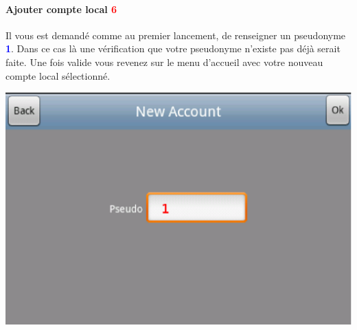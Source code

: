 \paragraph{Ajouter compte local \textcolor{red}{6}\\}
	Il vous est demandé comme au premier lancement, de renseigner un pseudonyme 
	\textcolor{blue}{\textbf{1}}. Dans ce cas là une vérification que votre
	pseudonyme n'existe pas déjà serait faite. Une fois valide vous revenez sur le menu d'accueil avec votre
	nouveau compte local sélectionné.
	\begin{center}
		\includegraphics[scale=0.6]{Manuel/Img/9.eps}
	\end{center}
	
	